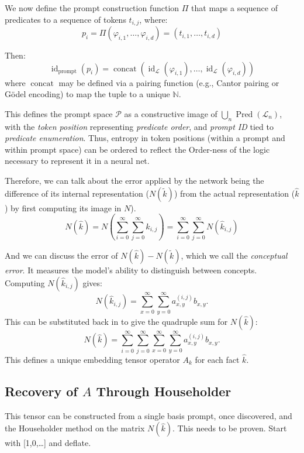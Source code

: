 \documentclass[12pt]{article}
\begin{document}
We now define the prompt construction function $\Pi$ that maps a sequence of predicates to a sequence of tokens $t_{i,j}$, where:
$$
p_i = \Pi(\varphi_{i,1}, \dots, \varphi_{i,d}) = (t_{i,1}, \dots, t_{i,d})
$$

Then:
$$
\operatorname{id}_{\text{prompt}}(p_i) = \operatorname{concat}\left(\operatorname{id}_{\mathcal{L}}(\varphi_{i,1}), \dots, \operatorname{id}_{\mathcal{L}}(\varphi_{i,d})\right)
$$
where $\operatorname{concat}$ may be defined via a pairing function (e.g., Cantor pairing or Gödel encoding) to map the tuple to a unique $\mathbb{N}$.

This defines the prompt space $\mathcal{P}$ as a constructive image of $\bigcup_n \operatorname{Pred}(\mathcal{L}_n)$, with the \emph{token position} representing \emph{predicate order}, and \emph{prompt ID} tied to \emph{predicate enumeration}.
Thus, entropy in token positions (within a prompt and within prompt space) can be ordered to reflect the Order-ness of the logic necessary to represent it in a neural net.

Therefore, we can talk about the error applied by the network being the difference of its internal representation ($N(\tilde{k})$) from the
actual representation ($\hat{k}$) by first computing its image in $N$).
$$
N(\hat{k}) = N\left(\sum_{i=0}^\infty \sum_{j=0}^\infty \hat{k}_{i,j}\right) = \sum_{i=0}^\infty \sum_{j=0}^\infty N(\hat{k}_{i,j})
$$

And we can discuss the error of $N(\hat{k}) - N(\tilde{k})$, which we call the \emph{conceptual error}. It measures the model’s ability to distinguish between concepts.
Computing $N(\hat{k}_{i,j})$ gives:
$$
N(\hat{k}_{i,j}) = \sum_{x=0}^\infty \sum_{y=0}^\infty a_{x,y}^{(i,j)} b_{x,y}.
$$
This can be substituted back in to give the quadruple sum for $N(\hat{k})$:
$$
N(\hat{k}) = \sum_{i=0}^\infty \sum_{j=0}^\infty \sum_{x=0}^\infty \sum_{y=0}^\infty a_{x,y}^{(i,j)} b_{x,y}.
$$
This defines a unique embedding tensor operator $A_k$ for each fact $\hat{k}$.

\subsection{Recovery of $A$ Through Householder}
This tensor can be constructed from a single basis prompt, once discovered, and the Householder method on the matrix $N(\hat{k})$. This needs to be proven. Start with [1,0,\ldots] and deflate.
\end{document}
